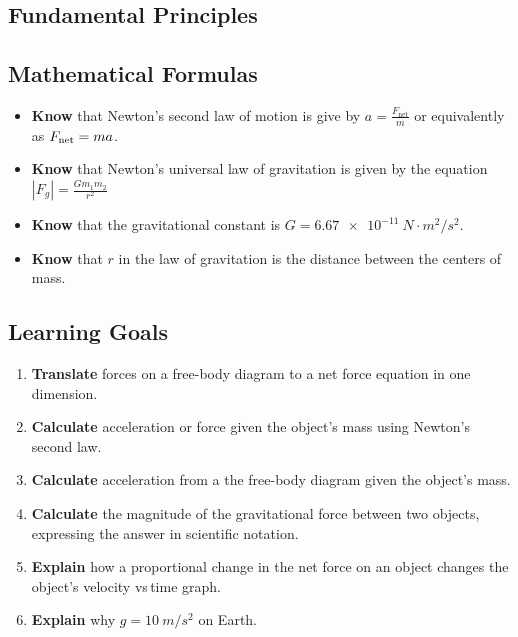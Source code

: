 \documentclass[dvipsnames]{article}
\begin{document}
\subsection*{Fundamental Principles}

\subsection*{Mathematical Formulas}

\begin{itemize}[itemsep=0pt]
    \item \textbf{Know} that Newton's second law of motion is give by $\displaystyle a = \frac{F_\mathrm{net}}{m}$ or equivalently as $F_\text{\scriptsize net} = ma$.
    \item \textbf{Know} that Newton's universal law of gravitation is given by the equation $\displaystyle |F_g| = \frac{G m_1 m_2}{r^2}$

    \begin{center}
    \end{center}
    
    \item \textbf{Know} that the gravitational constant is $\displaystyle G = \SI{6.67e-11}{N\cdot m^2/s^2}$.
    \item \textbf{Know} that $r$ in the law of gravitation is the distance between the centers of mass.
\end{itemize}

\subsection*{Learning Goals}

\begin{enumerate}[itemsep=0pt]
    \item \textbf{Translate} forces on a free-body diagram to a net force equation in one dimension.
    \item \textbf{Calculate} acceleration or force given the object's mass using Newton's second law.
    \item \textbf{Calculate} acceleration from a the free-body diagram given the object's mass.
    \item \textbf{Calculate} the magnitude of the gravitational force between two objects, expressing the answer in scientific notation.
    \item \textbf{Explain} how a proportional change in the net force on an object changes the object's velocity vs\,time graph.
    \item \textbf{Explain} why $g = \SI{10}{m/s^2}$ on Earth.
\end{enumerate}
\end{document}
